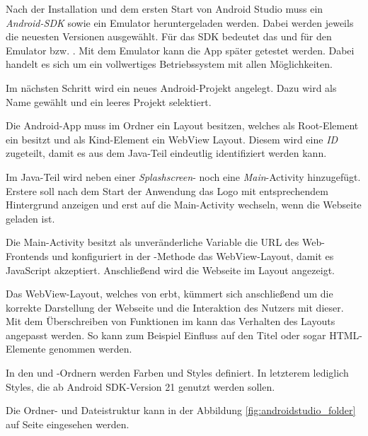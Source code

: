 Nach der Installation und dem ersten Start von Android Studio muss ein \textit{Android-SDK} sowie ein Emulator heruntergeladen
werden. Dabei werden jeweils die neuesten Versionen ausgewählt. Für das SDK bedeutet das  und für den Emulator
 bzw. . Mit dem Emulator kann die App später getestet werden. Dabei handelt es sich um ein
vollwertiges Betriebssystem mit allen Möglichkeiten.

Im nächsten Schritt wird ein neues Android-Projekt angelegt. Dazu wird als Name  gewählt und ein leeres
Projekt selektiert.

Die Android-App muss im Ordner  ein Layout besitzen, welches als Root-Element ein 
besitzt und als Kind-Element ein {WebView} Layout. Diesem wird eine \textit{ID} zugeteilt, damit es aus dem Java-Teil
eindeutlig identifiziert werden kann.

Im Java-Teil wird neben einer \textit{Splashscreen}- noch eine \textit{Main}-Activity hinzugefügt. Erstere soll nach dem
Start der Anwendung das Logo mit entsprechendem Hintergrund anzeigen und erst auf die Main-Activity wechseln, wenn die
Webseite geladen ist.

Die Main-Activity besitzt als unveränderliche Variable die URL des Web-Frontends und konfiguriert in der
-Methode das WebView-Layout, damit es JavaScript akzeptiert. Anschließend wird die Webseite im Layout
angezeigt.

Das WebView-Layout, welches von  erbt, kümmert sich anschließend um die korrekte Darstellung der
Webseite und die Interaktion des Nutzers mit dieser. Mit dem Überschreiben von Funktionen im  kann
das Verhalten des Layouts angepasst werden. So kann zum Beispiel Einfluss auf den Titel oder sogar HTML-Elemente
genommen werden.

In den  und -Ordnern werden Farben und Styles definiert. In letzterem lediglich
Styles, die ab Android SDK-Version 21 genutzt werden sollen.

Die Ordner- und Dateistruktur kann in der Abbildung \ref{fig:androidstudio_folder} auf Seite \pageref{fig:androidstudio_folder}
eingesehen werden.

